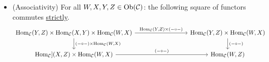 \begin{defi}
\begin{itemize}
	\item 
	(Associativity) 
	For all $ W , X , Y , Z \in \operatorname{Ob} ( \mathcal{ C } ) $: the following square of functors commutes \underline{strictly}.
	\[
	\begin{tikzcd}[column sep= 3cm]
		\Hom_{ \mathcal{ C } } ( Y , Z ) \times \Hom_{ \mathcal{ C } } ( X , Y ) \times \Hom_{ \mathcal{ C } } ( W , X )
		\ar[r, " {\Hom_{ \mathcal{ C  } } ( Y , Z ) \times ( - \circ - ) }"]
		\ar[d, "{ ( - \circ - ) \times \Hom_{ \mathcal{ C } } ( W , X ) }"]
		&
		\Hom_{\mathcal{ C } } ( Y , Z ) \times \Hom_{ \mathcal{ C } } ( W , X )
		\ar[d, " {( - \circ - ) }"]
		\\
		\Hom_{ \mathcal{ C }}]( X , Z ) \times \Hom_{\mathcal{ C } } ( W , X )
		\ar[r, "{ ( - \circ -) }"]
		&
		\Hom_{ \mathcal{ C } }  ( W , Z )
	\end{tikzcd}
	\]
\end{itemize}
\end{defi}


